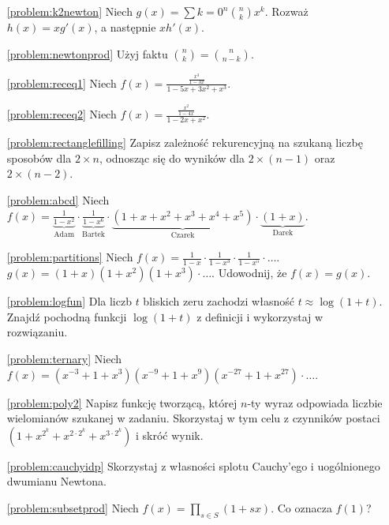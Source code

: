 \documentclass[shortabstract]{imthesis}
\begin{document}
\begin{enumerate}

\item[\ref{problem:k2newton}] Niech $g(x) = \sum{k=0}^n {n \choose k} x^k$. Rozważ $h(x) = xg'(x)$, a następnie $xh'(x)$.

\item[\ref{problem:newtonprod}] Użyj faktu ${n \choose k} = {n \choose n-k}$.

\item[\ref{problem:receq1}] Niech $f(x) = \frac{\frac{x^3}{1-3x}}{1-5x+3x^2+x^3}$.

\item[\ref{problem:receq2}] Niech $f(x) = \frac{\frac{x^2}{1-4x}}{1-2x+x^2}$.

\item[\ref{problem:rectanglefilling}] Zapisz zależność rekurencyjną na szukaną liczbę sposobów dla $2 \times n$, odnosząc się do wyników dla $2 \times (n-1)$ oraz $2 \times (n-2)$.

\item[\ref{problem:abcd}] Niech $f(x) = \underbrace{\frac{1}{1-x^2}}_{\text{Adam}} \cdot \underbrace{\frac{1}{1-x^6}}_{\text{Bartek}} \cdot \underbrace{(1+x+x^2+x^3+x^4+x^5)}_{\text{Czarek}} \cdot \underbrace{(1+x)}_{\text{Darek}}$.

\item[\ref{problem:partitions}] Niech $f(x) = \frac{1}{1-x} \cdot \frac{1}{1-x^3} \cdot \frac{1}{1-x^5} \cdot \ldots$. $g(x) = (1+x)(1+x^2)(1+x^3)\cdot\ldots$. Udowodnij, że $f(x) = g(x)$.

\item[\ref{problem:logfun}] Dla liczb $t$ bliskich zeru zachodzi własność $t \approx \log(1+t)$. Znajdź pochodną funkcji $\log(1+t)$ z definicji i wykorzystaj w rozwiązaniu.

\item[\ref{problem:ternary}] Niech $f(x) = (x^{-3} + 1 + x^{3})(x^{-9} + 1 + x^{9})(x^{-27} + 1 + x^{27})\cdot\ldots$.

\item[\ref{problem:poly2}] Napisz funkcję tworzącą, której $n$-ty wyraz odpowiada liczbie wielomianów szukanej w zadaniu. Skorzystaj w tym celu z czynników postaci $\left(1 + x^{2^k} + x^{2 \cdot 2^k} + x^{3 \cdot 2^k}\right)$ i skróć wynik.

\item[\ref{problem:cauchyidp}] Skorzystaj z własności splotu Cauchy'ego i uogólnionego dwumianu Newtona.

\item[\ref{problem:subsetprod}] Niech $f(x) = \prod_{s \in S} (1 + sx)$. Co oznacza $f(1)$?


\end{enumerate}
\end{document}
